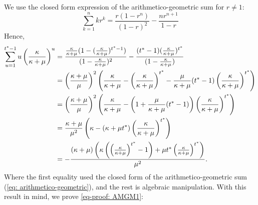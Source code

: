         We use the closed form expression of the arithmetico-geometric sum for $r \not= 1$:
        \begin{equation}
        \label{eq: arithmetico-geometric}
        \sum_{k=1}^{n} k r^k = \frac{r(1-r^n)}{(1-r)^2} - \frac{n r^{n+1}}{1-r}
        \end{equation}
        Hence,
        \begin{align*}
            \sum_{u=1}^{t^*-1} u \left(\frac{\kappa}{\kappa+\mu}\right)^{u} &= \frac{ \frac{\kappa}{\kappa + \mu} (1 - ( \frac{\kappa}{\kappa + \mu})^{t^*-1})}{(1 - \frac{\kappa}{\kappa + \mu})^2} - \frac{(t^*-1) (\frac{\kappa}{\kappa + \mu})^{t^*}}{(1 - \frac{\kappa}{\kappa + \mu})}\\
            &= \left(\frac{\kappa + \mu}{\mu}\right)^2 \left( \frac{\kappa}{\kappa + \mu} - \left( \frac{\kappa}{\kappa + \mu}\right)^{t^*} - \frac{\mu}{\kappa + \mu} (t^*-1) \left(\frac{\kappa}{\kappa + \mu}\right)^{t^*} \right)\\
            &= \left(\frac{\kappa + \mu}{\mu}\right)^2 \left( \frac{\kappa}{\kappa + \mu} - \left(1 +  \frac{\mu}{\kappa + \mu} (t^*-1) \right) \left(\frac{\kappa}{\kappa + \mu}\right)^{t^*} \right)\\
            &= \frac{\kappa + \mu}{\mu^2} \left( \kappa - (\kappa + \mu t^*) \left(\frac{\kappa}{\kappa + \mu}\right)^{t^*} \right)\\
            &= -\frac{(\kappa + \mu) \left( \kappa \left(  \left( \frac{\kappa}{\kappa + \mu} \right)^{t^*} -1 \right) + \mu t^* \left( \frac{\kappa}{\kappa + \mu} \right)^{t^*} \right)}{\mu^2}.
        \end{align*}
        Where the first equality used the closed form of the arithmetico-geometric sum (\ref{eq: arithmetico-geometric}), and the rest is algebraic manipulation.  With this result in mind, we prove \ref{eq-proof: AMGM1}:
